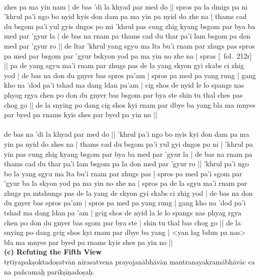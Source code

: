 \documentclass[12pt]{article}
\begin{document}
\textbf{\TVA}\\
zhes pa ma yin nam | de bas 'di la khyad par med do || spros pa la dmigs pa ni 'khrul pa'i ngo bo nyid kyis don dam pa ma yin pa nyid do zhe na | thams cad du bsgom pa'i yul gyis dngos po mi 'khrul pas cung zhig kyang bsgom par bya ba med par 'gyur la | de bas na rnam pa thams cad du thar pa'i lam bsgom pa don med par 'gyur ro || de ltar 'khrul yang sgyu ma lta bu'i rnam par zhugs pas spros pa med par bsgom par 'gyur bskyon yod pa ma yin no zhe na | spras [\TVA\ fol.\ 212r] || pa de yang sgyu ma'i rnam par zhugs pas de la yang skyon gyi skabs ci zhig yod | de bas na don du gnyer bas spros pa'am | spros pa med pa yang rung | gang kho na 'dod pa'i tshad ma dang ldan pa'am | cig shos de nyid le lo spangs nas phyag rgya chen po don du gnyer bas bsgom par bya ste shin tu thal ches pas chog go || de la snying po dang cig shos kyi rnam par dbye ba yang bla ma mnyes par byed pa rnams kyis shes par byed pa yin no || \\

\textbf{\TVB}\\
de bas na 'di la khyad par med do || 'khrul pa'i ngo bo nyis kyi don dam pa ma yin pa nyid do zhes na | thams cad du bsgom pa'i yul gyi dngos po ni | 'khrul pa yin pas cung zhig kyang bsgom par bya ba med par 'gyur la | de bas na rnam pa thams cad du thar pa'i lam bsgom pa la don med par 'gyur ro || 'khrul pa'i ngo bo la yang sgyu ma lta bu'i rnam par zhugs pas | spros pa med pa'i sgom par 'gyur ba la skyon yod pa ma yin no zhe na | spros pa de la sgyu ma'i rnam par zhugs pa mtshungs pas de la yang de skyon gyi skabs ci zhig yod | de bas na don du gnyer bas spros pa'am | spros pa med pa yang rung | gang kho na 'dod pa'i tshad ma dang ldan pa 'am | gcig shos de nyid la le lo spangs nas phyag rgya chen po don du gnyer bas sgom par bya ste | shin tu thal bas chog go || de la snying po dang gcig shos kyi rnam par dbye ba yang | <yan lag bdun pa nas> bla ma mnyes par byed pa rnams kyis shes pa yin no || \\

\textbf{(c) Refuting the Fifth View}\\
tṛtīyapakṣoktadoṣatvān nīrasatvena\footnoteB{
	nīrasatvena] \conj ; nīrasatvena te \MS\ \EDD
} prayojanābhāvān mantranayakramābhāvāc ca na pañcamaḥ parikṣīṇadoṣaḥ.\\
\end{document}
